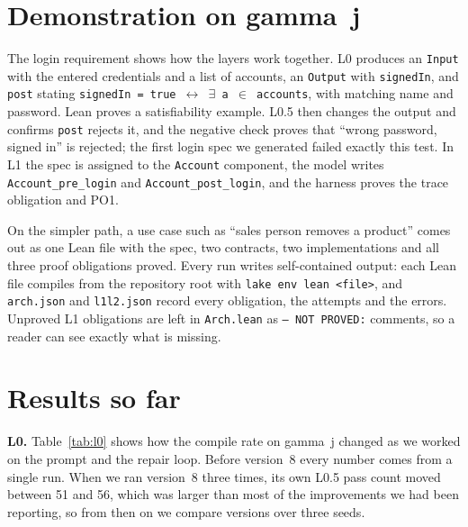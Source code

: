 \documentclass[10pt,a4paper]{article}
\newcommand{\code}[1]{\texttt{\small #1}}
\begin{document}
\section{Demonstration on gamma~j}
The login requirement shows how the layers work together. L0 produces an \code{Input} with the entered credentials and a list of accounts, an \code{Output} with \code{signedIn}, and \code{post} stating \code{signedIn = true $\leftrightarrow$ $\exists$ a $\in$ accounts}, with matching name and password. Lean proves a satisfiability example. L0.5 then changes the output and confirms \code{post} rejects it, and the negative check proves that ``wrong password, signed in'' is rejected; the first login spec we generated failed exactly this test. In L1 the spec is assigned to the \code{Account} component, the model writes \code{Account\_pre\_login} and \code{Account\_post\_login}, and the harness proves the trace obligation and PO1.

On the simpler path, a use case such as ``sales person removes a product'' comes out as one Lean file with the spec, two contracts, two implementations and all three proof obligations proved. Every run writes self-contained output: each Lean file compiles from the repository root with \code{lake env lean <file>}, and \code{arch.json} and \code{l1l2.json} record every obligation, the attempts and the errors. Unproved L1 obligations are left in \code{Arch.lean} as \code{-- NOT PROVED:} comments, so a reader can see exactly what is missing.

\section{Results so far}
\textbf{L0.} Table~\ref{tab:l0} shows how the compile rate on gamma~j changed as we worked on the prompt and the repair loop. Before version~8 every number comes from a single run. When we ran version~8 three times, its own L0.5 pass count moved between 51 and 56, which was larger than most of the improvements we had been reporting, so from then on we compare versions over three seeds.
\end{document}
